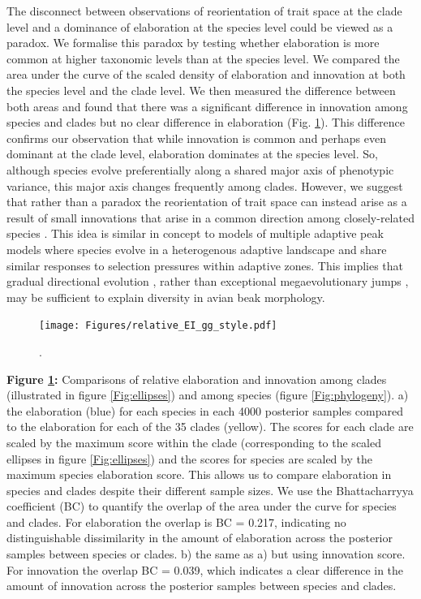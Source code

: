 \documentclass[12pt,letterpaper]{article}
\begin{document}

The disconnect between observations of reorientation of trait space at the clade level and a dominance of elaboration at the species level could be viewed as a paradox.
We formalise this paradox by testing whether elaboration is more common at higher taxonomic levels than at the species level.
We compared the area under the curve of the scaled density of elaboration and innovation at both the species level and the clade level.
We then measured the difference between both areas and found that there was a significant difference in innovation among species and clades but no clear difference in elaboration (Fig. \ref{Fig:relative_EI}).
This difference confirms our observation that while innovation is common and perhaps even dominant at the clade level, elaboration dominates at the species level. So, although species evolve preferentially along a shared major axis of phenotypic variance, this major axis changes frequently among clades.
However, we suggest that rather than a paradox the reorientation of trait space can instead arise as a result of small innovations that arise in a common direction among closely-related species \cite{hansen1997stabilizing}.
This idea is similar in concept to models of multiple adaptive peak models where species evolve in a heterogenous adaptive landscape and share similar responses to selection pressures within adaptive zones.
This implies that gradual directional evolution \cite{pagel2022general}, rather than exceptional megaevolutionary jumps \cite{cooney2017mega,venditti2011multiple}, may be sufficient to explain diversity in avian beak morphology.

\begin{figure}[!htbp]
\centering
   \texttt{[image: Figures/relative\_EI\_gg\_style.pdf]}
\caption{.}
\label{Fig:relative_EI}
\end{figure}

\bigskip

\noindent \textbf{Figure \ref{Fig:relative_EI}:} Comparisons of relative elaboration and innovation among clades (illustrated in figure \ref{Fig:ellipses}) and among species (figure \ref{Fig:phylogeny}).
a) the elaboration (blue) for each species in each 4000 posterior samples compared to the elaboration for each of the 35 clades (yellow).
The scores for each clade are scaled by the maximum score within the clade (corresponding to the scaled ellipses in figure \ref{Fig:ellipses}) and the scores for species are scaled by the maximum species elaboration score.
This allows us to compare elaboration in species and clades despite their different sample sizes.
We use the Bhattacharryya coefficient (BC) to quantify the overlap of the area under the curve for species and clades. 
For elaboration the overlap is BC = 0.217, indicating no distinguishable dissimilarity in the amount of elaboration across the posterior samples between species or clades. 
b) the same as a) but using innovation score. 
For innovation the overlap BC = 0.039, which indicates a clear difference in the amount of innovation across the posterior samples between species and clades.
\end{document}

